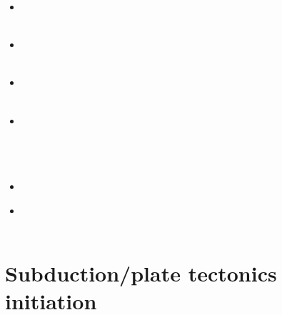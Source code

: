 \begin{scriptsize}
\begin{itemize}
\textcite{qubu14} \\
\textcite{mabv14} \\ 
\textcite{malg14} \\ 
\textcite{wisv14} \\
\item[\twothousandfifteen] 
\textcite{bomv15} \\
\textcite{nani15} \\
\item[\twothousandseventeen] 
\textcite{ceww17} \\
\textcite{wewv17} \\
\item[\twothousandeighteen] 
\textcite{fade18} \\
\textcite{wakc18b} \\
\item[\twothousandnineteen] 
\textcite{ceww19} \\ 
\textcite{meag19} \\
\textcite{ligc19} \\
\textcite{prdp19} \\
\item[\twothousandtwentyone] 
\textcite{lesc21} \\
\item[\twothousandtwentytwo] 
\textcite{li22} \\
\textcite{ceap22} \\
\end{itemize}
\end{scriptsize}

\section{Subduction/plate tectonics initiation}


